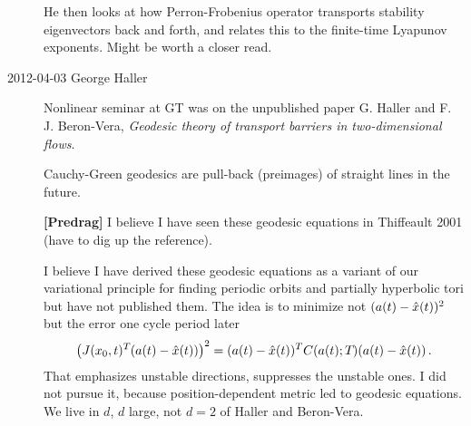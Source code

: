 \begin{description}
He then looks at how Perron-Frobenius operator transports
stability eigenvectors back and forth, and relates this to
the finite-time Lyapunov exponents. Might be worth a closer read.

\item[2012-04-03 George Haller]
Nonlinear seminar at GT was on the unpublished paper G. Haller and F. J.
Beron-Vera, \emph{Geodesic theory of transport barriers in
two-dimensional flows}.

Cauchy-Green geodesics are pull-back (preimages) of straight lines in the future.

{\bf [Predrag]}
I believe I have seen these geodesic equations in Thiffeault 2001 (have
to dig up  the reference).

I believe I have derived these geodesic equations as a variant of our
variational principle for finding periodic orbits and partially
hyperbolic tori but have not published
them. The idea is to minimize not $(a(t) -\hat{x}(t))^2$ but
the error one cycle period later
\[
\left(J({x_0},t)^{T_{}}(a(t) -\hat{x}(t))\right)^2
= (a(t) -\hat{x}(t))^T C(a(t); {T_{}})(a(t) -\hat{x}(t))
\,.
\]
That emphasizes unstable directions, suppresses the unstable ones. I did
not pursue it, because position-dependent metric led to geodesic
equations. We live in $d$\dmn, $d$ large, not $d=2$ of Haller and
Beron-Vera.



\end{description}
